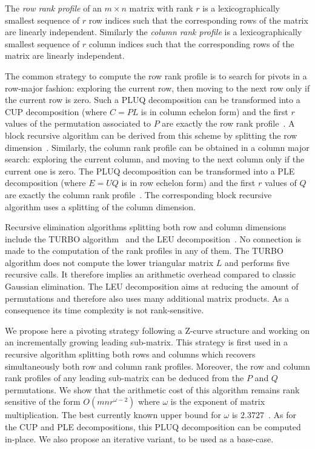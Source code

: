 \documentclass{article}
\begin{document}
The {\em row rank profile} of an $m\times n$ matrix with rank $r$ is a
lexicographically smallest sequence of $r$ row indices such that the
corresponding rows of the matrix are linearly independent. 
Similarly the {\em column rank profile} is a lexicographically smallest sequence
of $r$ column indices such that the corresponding rows of the matrix are
linearly independent.

The common strategy to compute the row rank profile is to search for pivots in
a row-major fashion: exploring the current row, then moving to the next row only
if the current row is zero. Such a PLUQ decomposition can be transformed into a
CUP decomposition (where $C=PL$ is in column echelon form) and the first
$r$ values of the permutation associated to $P$ are exactly the row rank
profile~\cite{JPS:2011}. A block recursive algorithm can be derived from this scheme by
splitting the row dimension~\cite{Ibarra:1982:LSP}.
Similarly, the column rank profile can be obtained in a column major search:
exploring the current column, and moving to the next column only if the
current one is zero. The PLUQ decomposition can be transformed into a PLE
decomposition (where $E=UQ$ is in row echelon form) and the first $r$ values of
$Q$ are exactly the column rank profile~\cite{JPS:2011}. The corresponding block
recursive algorithm uses a splitting of the column dimension.


Recursive elimination algorithms splitting both row and column dimensions
include the TURBO algorithm~\cite{jgd:2002:PComp} and the LEU
decomposition~\cite{Malaschonok:2010}. 
No connection is made to the computation of the rank profiles in any of them.
The TURBO algorithm does not compute the lower triangular matrix $L$ and
performs five recursive calls. It therefore implies an arithmetic overhead
compared to classic Gaussian elimination.
The LEU decomposition aims at reducing the amount of permutations and therefore also
uses many additional matrix products. As a consequence its time complexity
is not rank-sensitive.



We propose here a pivoting strategy following a Z-curve structure and
working on an incrementally growing leading sub-matrix. 
This strategy is first used in a recursive algorithm splitting both rows
and columns which recovers simultaneously both row and column rank profiles.
Moreover, the row and column rank profiles of any
leading sub-matrix can be deduced from the $P$ and $Q$ permutations.
We show that the arithmetic cost of this algorithm remains rank sensitive of the
form $O(mnr^{\omega-2})$ where $\omega$ is the exponent of matrix
multiplication. The best currently known upper bound for $\omega$ is
$2.3727$~\cite{Williams:2012:matmul}.
As for the CUP and PLE decompositions, this PLUQ decomposition can be computed
in-place. We also propose an iterative variant, to be used as a base-case.  
 
\end{document}
